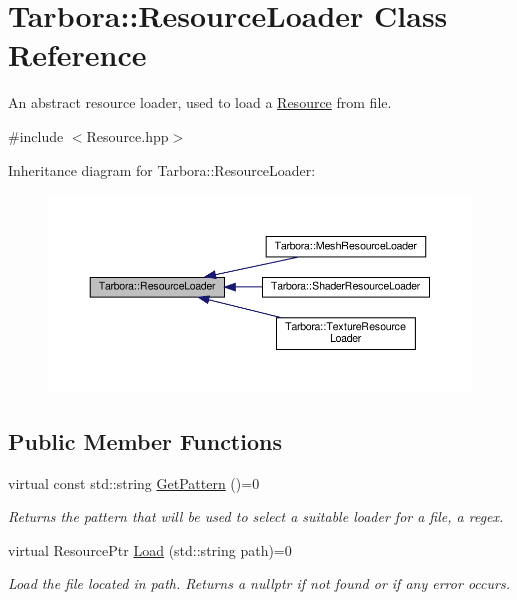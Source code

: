 \hypertarget{classTarbora_1_1ResourceLoader}{}\section{Tarbora\+:\+:Resource\+Loader Class Reference}
\label{classTarbora_1_1ResourceLoader}


An abstract resource loader, used to load a \hyperlink{classTarbora_1_1Resource}{Resource} from file.  




{\ttfamily \#include $<$Resource.\+hpp$>$}



Inheritance diagram for Tarbora\+:\+:Resource\+Loader\+:\nopagebreak
\begin{figure}[H]
\begin{center}
\leavevmode
\includegraphics[width=350pt]{classTarbora_1_1ResourceLoader__inherit__graph}
\end{center}
\end{figure}
\subsection*{Public Member Functions}
\begin{DoxyCompactItemize}
\item 
\mbox{\label{classTarbora_1_1ResourceLoader_a03897df5acadacb55a9b85c6054cb1d9}} 
virtual const std\+::string \hyperlink{classTarbora_1_1ResourceLoader_a03897df5acadacb55a9b85c6054cb1d9}{Get\+Pattern} ()=0
\begin{DoxyCompactList}\small\item\em Returns the pattern that will be used to select a suitable loader for a file, a regex. \end{DoxyCompactList}\item 
\mbox{\label{classTarbora_1_1ResourceLoader_af64faaac34968cb8bb5582fdfa449ca8}} 
virtual Resource\+Ptr \hyperlink{classTarbora_1_1ResourceLoader_af64faaac34968cb8bb5582fdfa449ca8}{Load} (std\+::string path)=0
\begin{DoxyCompactList}\small\item\em Load the file located in {\itshape path}. Returns a nullptr if not found or if any error occurs. \end{DoxyCompactList}\end{DoxyCompactItemize}


